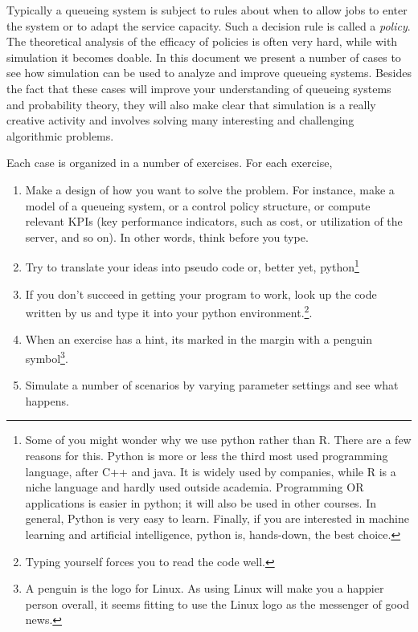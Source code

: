 Typically a queueing system is subject to rules about when to allow jobs to enter the system or to adapt the service capacity.
Such a decision rule is called a \emph{policy}.
The theoretical analysis of the efficacy of policies is often very hard, while with simulation it becomes doable.
In this document we present a number of cases to see how simulation can be used to analyze and improve queueing systems.
Besides the fact that these cases will improve your understanding of queueing systems and probability theory, they will also make clear that simulation is a really creative activity and involves solving many interesting and challenging algorithmic problems.


Each case is organized in a number of exercises.
For each exercise,
\begin{enumerate}
\item Make a design of how you want to solve the problem.
  For instance, make a model of a queueing system, or a control policy structure, or compute relevant KPIs (key performance indicators, such as cost, or utilization of the server, and so on).
  In other words, think before you type.
\item Try to translate your ideas into pseudo code or, better yet, python\footnote{Some of you might wonder why we use python rather than R.
    There are a few reasons for this.
    Python is more or less the third most used programming language, after C++ and java.
    It is widely used by companies, while R is a niche language and hardly used outside academia.
    Programming OR applications is easier in python; it will also be used in other courses.
    In general, Python is very easy to learn.
    Finally, if you are interested in machine learning and artificial intelligence, python is, hands-down, the best choice.}
  \item If you don't succeed in getting your program to work,  look up the code written by us and type it into your python environment.\footnote{Typing yourself forces you to read the code well.}.
  \item When an exercise has a hint, its marked in the margin with a penguin symbol\footnote{A penguin is the logo for Linux.
      As using Linux will make you a happier person overall, it seems fitting to use the Linux logo as the messenger of good news.}.
    
  \item Simulate a number of scenarios by varying parameter settings and see what happens.
\end{enumerate}

